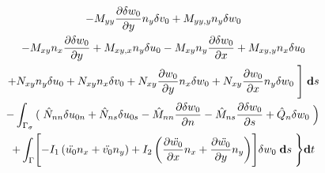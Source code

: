 \documentclass[11pt,letterpaper,titlepage,draft]{article}
\newcommand{\diff}{\textbf d}
\newcommand{\PDer}[2]{\frac{\partial #1}{\partial #2}}
\newcommand{\Vartn}[1]{\delta #1}
\numberwithin{equation}{subsection}
\begin{document}
\begin{multline}
                                               - M_{yy}\PDer{\Vartn{w_0}}{y}n_y\Vartn{v_0}
                                               + M_{yy,y}n_y\Vartn{w_0}
\\
                                               - M_{xy}n_x\PDer{\Vartn{w_0}}{y}
                                               + M_{xy,x}n_y\Vartn{u_0}
                                               - M_{xy}n_y\PDer{\Vartn{w_0}}{x}
                                               + M_{xy,y}n_x\Vartn{u_0}
\\
                                               + N_{xy}n_y\Vartn{u_0}
                                               + N_{xy}n_x\Vartn{v_0}
                                               + N_{xy}\PDer{w_0}{y}n_x\Vartn{w_0}
                                               + N_{xy}\PDer{w_0}{x}n_y\Vartn{w_0}
\left.\Bigg]\right. \diff{s}
\\
- \int_{\Gamma_{\sigma}} \left(\right.
                                                 \hat{N}_{nn}\Vartn{u_{0n}}
                                               + \hat{N}_{ns}\Vartn{u_{0s}}
                                               - \hat{M}_{nn}\PDer{\Vartn{w_0}}{n}
                                               - \hat{M}_{ns}\PDer{\Vartn{w_0}}{s}
                                               + \hat{Q}_{n}\Vartn{w_0}
\left.\Bigr)\right.
\\
+ \int_{\Gamma} \Biggl[
                                               -I_1\left(\ddot{u_0}n_x + \ddot{v_0}n_y\right)
                                               +I_2\left( \PDer{\ddot{w_0}}{x} n_x + \PDer{\ddot{w_0}}{y}n_y\right)
\Biggr]\Vartn{w_0} \; \diff{s} \; \Biggr\}\diff{t} 
\end{multline}
\end{document}
